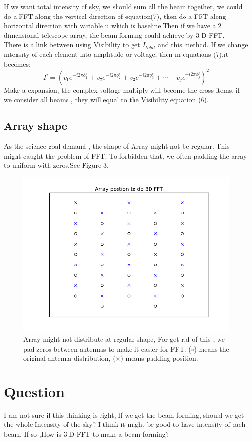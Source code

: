 \documentclass{article}
\begin{document}
If we want total intensity of sky, we should sum all the beam together, we could do a FFT along the vertical direction of equation(7), then do a FFT along horizontal direction with variable u which is baseline.Then if we have a 2  dimensional telescope array, the beam forming could achieve by 3-D FFT.\\
There is a link between using Visibility to get $I_{total}$ and this method. If we change intensity of each element into amplitude or voltage, then in equations (7),it becomes:
\begin{equation}
I^i=(v_1e^{-i2\pi\phi_1^i}+v_2e^{-i2\pi\phi_2^i}+v_3e^{-i2\pi\phi_3^i}+\cdots+v_je^{-i2\pi\phi_j^i})^2
\end{equation}
Make a expansion, the complex voltage multiply will become the cross items. if we consider all beams , they will equal to the Visibility equation (6).
\subsection{Array shape}
As the science goal demand , the shape of Array might not be regular. This might caught the problem of FFT. To forbidden that, we often padding the array to uniform with zeros.See Figure 3.\\
\begin{figure}
\includegraphics[width=\textwidth]{array_postion_to_3DFFT_beamforming.png}
\caption{Array might not distribute at regular shape, For get rid of this , we pad zeros between antennas to make it easier for FFT. ($\circ$) means the original antenna distribution, ($\times$) means padding position.}
\end{figure}

\section{Question}
I am not sure if this thinking is right, If we get the beam forming, should we get the whole Intensity of the sky? I think it might be good to have intensity of each beam. If so ,How is 3-D FFT to make a beam forming?
\end{document}
